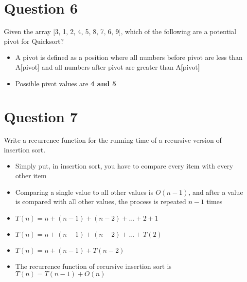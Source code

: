 \documentclass{report}
\begin{document}
    \section{Question 6}
    Given the array [3, 1, 2, 4, 5, 8, 7, 6, 9], which of the following are a potential pivot for Quicksort?
        \begin{itemize}
            \item{A pivot is defined as a position where all numbers before pivot are less than A[pivot] and all numbers after pivot are greater than A[pivot]}
            \item{Possible pivot values are \textbf{4 and 5}}
        \end{itemize}

    \section{Question 7}
    Write a recurrence function for the running time of a recursive version of insertion sort.
    	\begin{itemize}
    		\item{Simply put, in insertion sort, you have to compare every item with every other item}
    		\item{Comparing a single value to all other values is $O(n - 1)$, and after a value is compared with all other values, the process is repeated $n-1$ times}
    		\item{$T(n) = n + (n - 1) + (n - 2) + ... + 2 + 1$}
    		\item{$T(n) = n + (n - 1) + (n-2) + ... + T(2)$}
    		\item{$T(n) = n + (n - 1) + T(n-2)$}
    		\item{The recurrence function of recursive insertion sort is \textbf{$T(n) = T(n-1) + O(n)$}}
		\end{itemize}
\end{document}
